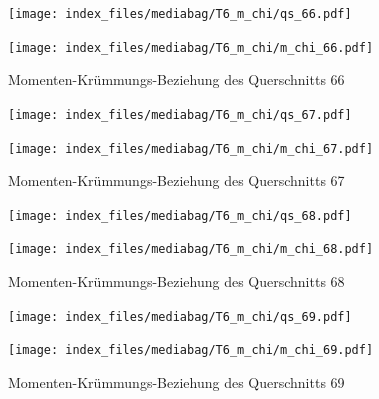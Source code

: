 \documentclass[
  11pt,
  letterpaper,
]{scrreprt}
\begin{document}
\begin{figure}[H]

\begin{minipage}{0.50\linewidth}
\texttt{[image: index\_files/mediabag/T6\_m\_chi/qs\_66.pdf]}\end{minipage}%
%
\begin{minipage}{0.50\linewidth}
\texttt{[image: index\_files/mediabag/T6\_m\_chi/m\_chi\_66.pdf]}\end{minipage}%

\caption{\label{fig-mchi_anhang}Momenten-Krümmungs-Beziehung des
Querschnitts 66}

\end{figure}%

\begin{figure}[H]

\begin{minipage}{0.50\linewidth}
\texttt{[image: index\_files/mediabag/T6\_m\_chi/qs\_67.pdf]}\end{minipage}%
%
\begin{minipage}{0.50\linewidth}
\texttt{[image: index\_files/mediabag/T6\_m\_chi/m\_chi\_67.pdf]}\end{minipage}%

\caption{\label{fig-mchi_anhang}Momenten-Krümmungs-Beziehung des
Querschnitts 67}

\end{figure}%

\begin{figure}[H]

\begin{minipage}{0.50\linewidth}
\texttt{[image: index\_files/mediabag/T6\_m\_chi/qs\_68.pdf]}\end{minipage}%
%
\begin{minipage}{0.50\linewidth}
\texttt{[image: index\_files/mediabag/T6\_m\_chi/m\_chi\_68.pdf]}\end{minipage}%

\caption{\label{fig-mchi_anhang}Momenten-Krümmungs-Beziehung des
Querschnitts 68}

\end{figure}%

\begin{figure}[H]

\begin{minipage}{0.50\linewidth}
\texttt{[image: index\_files/mediabag/T6\_m\_chi/qs\_69.pdf]}\end{minipage}%
%
\begin{minipage}{0.50\linewidth}
\texttt{[image: index\_files/mediabag/T6\_m\_chi/m\_chi\_69.pdf]}\end{minipage}%

\caption{\label{fig-mchi_anhang}Momenten-Krümmungs-Beziehung des
Querschnitts 69}

\end{figure}%
\end{document}

